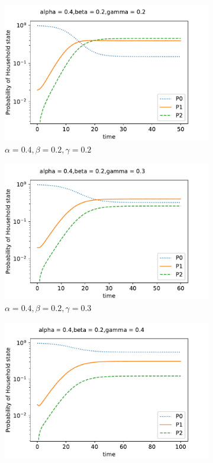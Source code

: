 \documentclass[paper=a4, fontsize=11pt, twoside, BCOR=12mm, parskip=full, listof=totoc]{scrreprt}
\begin{document}
{\begin{figure}[H]
 \centering
	\begin{subfigure}[b]{0.4\linewidth}
	  \includegraphics[width=\linewidth]{sim/01g1.pdf}
	  \caption{\(\alpha=0.4, \beta=0.2, \gamma=0.2\)}
	  \label{gamma two }
	\end{subfigure}
	\begin{subfigure}[b]{0.4\linewidth}
	  \includegraphics[width=\linewidth]{sim/023_b6.pdf}
	  \caption{\(\alpha=0.4, \beta=0.2, \gamma=0.3\)}
	  \label{gamma three}
	\end{subfigure}
	\begin{subfigure}[b]{0.4\linewidth}
	  \includegraphics[width=\linewidth]{sim/033_a1.pdf}

\end{subfigure}
\end{figure}}
\end{document}
